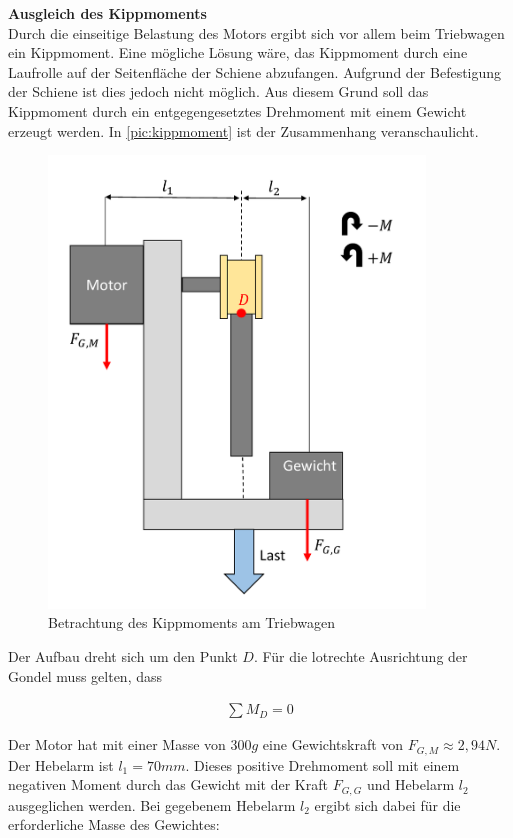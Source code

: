 \textbf{Ausgleich des Kippmoments}\\
 Durch die einseitige Belastung des Motors ergibt sich vor allem beim Triebwagen ein Kippmoment. Eine mögliche Lösung wäre, das Kippmoment durch eine Laufrolle auf der Seitenfläche der Schiene abzufangen. Aufgrund der Befestigung der Schiene ist dies jedoch nicht möglich. Aus diesem Grund soll das Kippmoment durch ein entgegengesetztes Drehmoment mit einem Gewicht erzeugt werden. In \autoref{pic:kippmoment} ist der Zusammenhang veranschaulicht. 

\begin{figure}[h]
	\centering
	\includegraphics[width=10cm]{kippmoment.pdf} 
	\caption{Betrachtung des Kippmoments am Triebwagen}
	\label{pic:kippmoment}
\end{figure}
Der Aufbau dreht sich um den Punkt $D$. Für die lotrechte Ausrichtung der Gondel muss gelten, dass 

\begin{align}
	\sum M_D = 0
\end{align}
\newpage 

 Der Motor hat mit einer Masse von $300g$ eine Gewichtskraft von $F_{G,M} \approx 2,94N$. Der Hebelarm ist $l_1=70mm$. Dieses positive Drehmoment soll mit einem negativen Moment durch das Gewicht mit der Kraft $F_{G,G}$ und Hebelarm $l_2$ ausgeglichen werden. Bei gegebenem Hebelarm $l_2$ ergibt sich dabei für die erforderliche Masse des Gewichtes:

